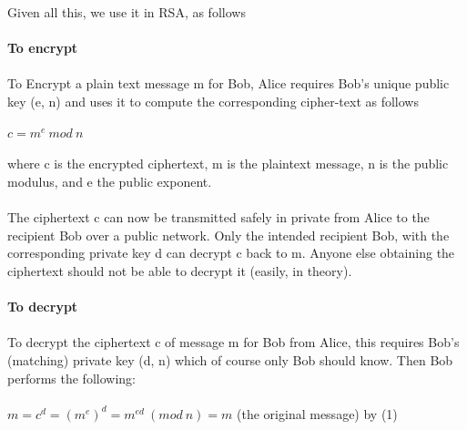 \documentclass[11pt]{article}   	%
\begin{document}
\\
Given all this, we use it in RSA, as follows \\
\\
\textbf{To encrypt} \\
\\
To Encrypt a plain text message m for Bob, Alice requires Bob's unique public key (e, n) and uses it to compute the corresponding cipher-text as follows \\
\\
$ c = m^e \ mod \ n $ \\
\\
where c is the encrypted ciphertext, m is the plaintext message, n is the public modulus, and e the public exponent. \\
\\
The ciphertext c can now be transmitted safely in private from Alice to the recipient Bob over a public network. Only the intended recipient Bob, with the corresponding private key d can decrypt c back to m. Anyone else obtaining the ciphertext should not be able to decrypt it (easily, in theory). \\
\\
\textbf{To decrypt} \\
\\
To decrypt the ciphertext c of message m for Bob from Alice, this requires Bob's (matching) private key (d, n) which of course only Bob should know. Then Bob performs the following: \\
\\
$ m = c^d = (m^e)^d = m^{ed} \ (mod \ n) = m$ (the original message) by (1) \\

\break 
\end{document}
